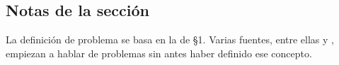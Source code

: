 \subsection*{Notas de la sección}

La definición de problema se basa en la de \textcite{skiena} \S 1. Varias fuentes, entre ellas \textcite{cardoso} y \textcite{levitin}, empiezan a hablar de problemas sin antes haber definido ese concepto.

